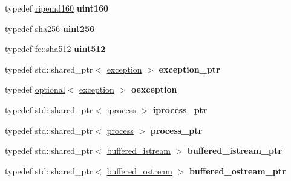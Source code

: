 \begin{DoxyCompactItemize}
\item 
\mbox{\label{namespacefc_a617e6e51560e0b0863d3fa56784ec21a}} 
typedef \mbox{\hyperlink{classfc_1_1ripemd160}{ripemd160}} {\bfseries uint160}
\item 
\mbox{\label{namespacefc_afdba39e66ca1f13c0f2e7efd1f9f7d82}} 
typedef \mbox{\hyperlink{classfc_1_1sha256}{sha256}} {\bfseries uint256}
\item 
\mbox{\label{namespacefc_aea50020ff4559adf099d43533cd5dbe7}} 
typedef \mbox{\hyperlink{classfc_1_1sha512}{fc\+::sha512}} {\bfseries uint512}
\item 
\mbox{\label{namespacefc_a15170d1be1e682691dfe6ae09790edce}} 
typedef std\+::shared\+\_\+ptr$<$ \mbox{\hyperlink{classfc_1_1exception}{exception}} $>$ {\bfseries exception\+\_\+ptr}
\item 
\mbox{\label{namespacefc_a16f272a3d05d2641cb2bf67bac4673dc}} 
typedef \mbox{\hyperlink{classfc_1_1optional}{optional}}$<$ \mbox{\hyperlink{classfc_1_1exception}{exception}} $>$ {\bfseries oexception}
\item 
\mbox{\label{namespacefc_a8b784d445918fe97a113bc87a205b442}} 
typedef std\+::shared\+\_\+ptr$<$ \mbox{\hyperlink{classfc_1_1iprocess}{iprocess}} $>$ {\bfseries iprocess\+\_\+ptr}
\item 
\mbox{\label{namespacefc_a0a869b6f84fdcccc2e021309f152255c}} 
typedef std\+::shared\+\_\+ptr$<$ \mbox{\hyperlink{classfc_1_1process}{process}} $>$ {\bfseries process\+\_\+ptr}
\item 
\mbox{\label{namespacefc_a1de1d095ba3c29dc0ced564bc8f45123}} 
typedef std\+::shared\+\_\+ptr$<$ \mbox{\hyperlink{classfc_1_1buffered__istream}{buffered\+\_\+istream}} $>$ {\bfseries buffered\+\_\+istream\+\_\+ptr}
\item 
\mbox{\label{namespacefc_a95f13893819c9b7254bd8dc1f906c497}} 
typedef std\+::shared\+\_\+ptr$<$ \mbox{\hyperlink{classfc_1_1buffered__ostream}{buffered\+\_\+ostream}} $>$ {\bfseries buffered\+\_\+ostream\+\_\+ptr}
\item 
\mbox{\label{namespacefc_a54370140f7c964a12e90393d525605d1}} 

\end{DoxyCompactItemize}
